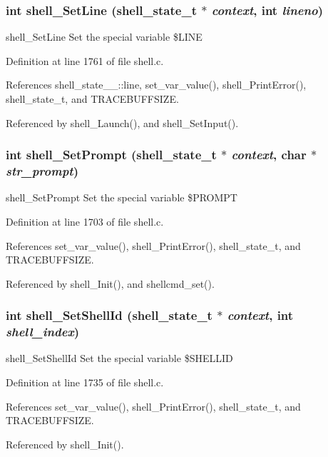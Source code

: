 \subsubsection{\setlength{\rightskip}{0pt plus 5cm}int shell\_\-Set\-Line ({\bf shell\_\-state\_\-t} $\ast$ {\em context}, int {\em lineno})}\label{shell_8c_a42}


shell\_\-Set\-Line Set the special variable \$LINE 

Definition at line 1761 of file shell.c.

References shell\_\-state\_\-\_\-::line, set\_\-var\_\-value(), shell\_\-Print\-Error(), shell\_\-state\_\-t, and TRACEBUFFSIZE.

Referenced by shell\_\-Launch(), and shell\_\-Set\-Input().
\subsubsection{\setlength{\rightskip}{0pt plus 5cm}int shell\_\-Set\-Prompt ({\bf shell\_\-state\_\-t} $\ast$ {\em context}, char $\ast$ {\em str\_\-prompt})}\label{shell_8c_a39}


shell\_\-Set\-Prompt Set the special variable \$PROMPT 

Definition at line 1703 of file shell.c.

References set\_\-var\_\-value(), shell\_\-Print\-Error(), shell\_\-state\_\-t, and TRACEBUFFSIZE.

Referenced by shell\_\-Init(), and shellcmd\_\-set().
\subsubsection{\setlength{\rightskip}{0pt plus 5cm}int shell\_\-Set\-Shell\-Id ({\bf shell\_\-state\_\-t} $\ast$ {\em context}, int {\em shell\_\-index})}\label{shell_8c_a41}


shell\_\-Set\-Shell\-Id Set the special variable \$SHELLID 

Definition at line 1735 of file shell.c.

References set\_\-var\_\-value(), shell\_\-Print\-Error(), shell\_\-state\_\-t, and TRACEBUFFSIZE.

Referenced by shell\_\-Init().

